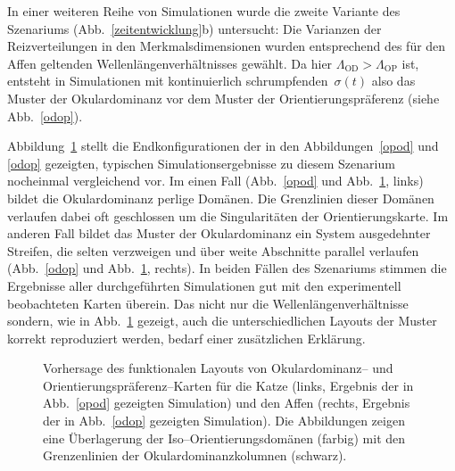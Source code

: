 In einer weiteren Reihe von Simulationen wurde die zweite Variante des
Szenariums (Abb.~\ref{zeitentwicklung}b) untersucht: Die Varianzen der
Reizverteilungen in den Merkmalsdimensionen wurden entsprechend des für
den Affen geltenden Wellen\-längen\-ver\-hältnisses gewählt. Da hier
$\Lambda_{\text{OD}} > \Lambda_{\text{OP}}$ ist, entsteht in Simulationen
mit kontinuierlich schrumpfenden~$\sigma(t)$ also das Muster der
Okulardominanz vor dem Muster der Orientierungspräferenz (siehe
Abb.~\ref{odop}).

Abbildung~\ref{simres} stellt die Endkonfigurationen der in den
Abbildungen~\ref{opod} und \ref{odop} gezeigten, typischen
Simulationsergebnisse zu diesem Szenarium nocheinmal vergleichend vor.  Im
einen Fall (Abb.~\ref{opod} und Abb.~\ref{simres}, links) bildet die
Okulardominanz perlige Domänen. Die Grenzlinien dieser Domänen verlaufen
dabei oft geschlossen um die Singularitäten der Orientierungskarte.  Im
anderen Fall bildet das Muster der Okulardominanz ein System ausgedehnter
Streifen, die selten verzweigen und über weite Abschnitte parallel
verlaufen (Abb.~\ref{odop} und Abb.~\ref{simres}, rechts).
In beiden Fällen des Szenariums stimmen die Ergebnisse aller durchgeführten
Simulationen gut mit den experimentell beobachteten Karten überein. Das
nicht nur die Wellenlängenverhältnisse sondern, wie in Abb.~\ref{simres}
gezeigt, auch die unterschiedlichen Layouts der Muster korrekt reproduziert
werden, bedarf einer zusätzlichen Erklärung.

\begin{figure}[t]
\begin{center}
\begin{minipage}[t]{6.2cm}
\end{minipage}
\hskip0.4cm
\begin{minipage}[t]{6.2cm}
\end{minipage}
\end{center}
\caption{Vorhersage des funktionalen Layouts von Okulardominanz-- und
Orientierungspräferenz--Karten für die Katze (links, Ergebnis der in
Abb.~\ref{opod} gezeigten Simulation) und den Affen (rechts, Ergebnis der
in Abb.~\ref{odop} gezeigten Simulation).  Die Abbildungen zeigen eine
Überlagerung der Iso--Orientierungsdomänen (farbig) mit den Grenzenlinien
der Okulardominanzkolumnen (schwarz).}
\label{simres}
\end{figure}


